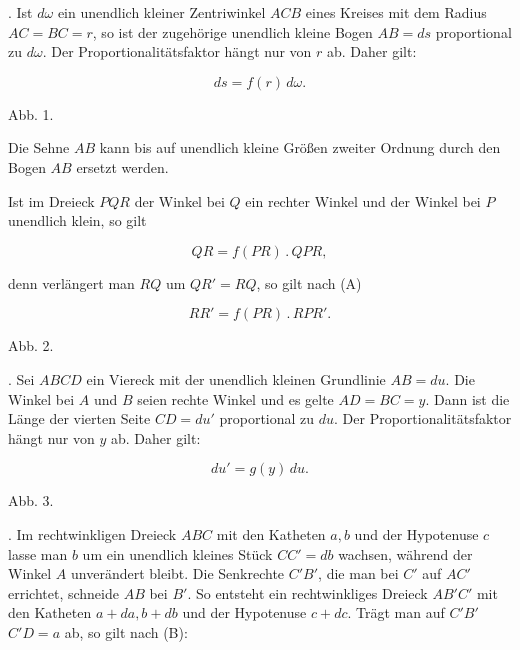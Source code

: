 \par{}%
. Ist $d\omega$ ein unendlich kleiner Zentriwinkel $ACB$ eines Kreises mit dem Radius $AC=BC=r$, so ist der zugehörige unendlich kleine Bogen $AB=ds$ proportional zu $d\omega$. Der Proportionalitätsfaktor hängt nur von $r$ ab. Daher gilt:

\[
\tag*{(A)} ds = f(r)\,d\omega.
\]

\begin{center}\begin{minipage}{\linewidth}\centering


Abb. 1.
\end{minipage}\end{center}

\noindent Die Sehne $AB$ kann bis auf unendlich kleine Größen zweiter Ordnung durch den Bogen $AB$ ersetzt werden.

\noindent Ist im Dreieck $PQR$ der Winkel bei $Q$ ein rechter Winkel und der Winkel bei $P$ unendlich klein, so gilt

\[
\tag*{(A')} QR = f(PR)\,.\,QPR,
\]

\noindent denn verlängert man $RQ$ um $QR' = RQ$, so gilt nach (A)

\[
RR' = f(PR)\,.\,RPR'.
\]

\begin{center}\begin{minipage}{\linewidth}\centering


Abb. 2.
\end{minipage}\end{center}

. Sei $ABCD$ ein Viereck mit der unendlich kleinen Grundlinie $AB=du$. Die Winkel bei $A$ und $B$ seien rechte Winkel und es gelte $AD=BC=y$. Dann ist die Länge der vierten Seite $CD=du'$ proportional zu $du$. Der Proportionalitätsfaktor hängt nur von $y$ ab. Daher gilt:

\[
\tag*{(B)} du' = g(y)\,du.
\]

\begin{center}\begin{minipage}{\linewidth}\centering


Abb. 3.
\end{minipage}\end{center}

. Im rechtwinkligen Dreieck $ABC$ mit den Katheten $a,b$ und der Hypotenuse $c$ lasse man $b$ um ein unendlich kleines Stück $CC'=db$ wachsen, während der Winkel $A$ unverändert bleibt. Die Senkrechte $C'B'$, die man bei $C'$ auf $AC'$ errichtet, schneide $AB$ bei $B'$. So entsteht ein rechtwinkliges Dreieck $AB'C'$ mit den Katheten $a+da, b+db$ und der Hypotenuse $c+dc$. Trägt man auf $C'B'$ \ $C'D=a$ ab, so gilt nach (B):

